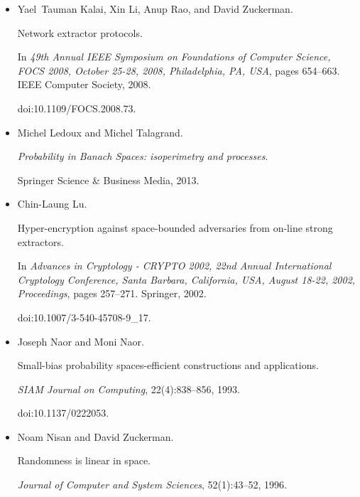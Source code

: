 \documentclass[10pt,a4paper]{article}
\begin{document}
\begin{itemize}
\item[] 
[24]

Yael Tauman Kalai, Xin Li, Anup Rao, and David Zuckerman.


Network extractor protocols.


In \emph{49th Annual IEEE Symposium on Foundations of Computer
Science, FOCS 2008, October 25-28, 2008, Philadelphia, PA, USA}, pages
654–663. IEEE Computer Society, 2008.


doi:10.1109/FOCS.2008.73.





\item[] 
[25]

Michel Ledoux and Michel Talagrand.


\emph{Probability in Banach Spaces: isoperimetry and processes}.


Springer Science \& Business Media, 2013.





\item[] 
[26]

Chin-Laung Lu.


Hyper-encryption against space-bounded adversaries from on-line
strong extractors.


In \emph{Advances in Cryptology - CRYPTO 2002, 22nd Annual
International Cryptology Conference, Santa Barbara, California, USA, August
18-22, 2002, Proceedings}, pages 257–271. Springer, 2002.


doi:10.1007/3-540-45708-9\_17.





\item[] 
[27]

Joseph Naor and Moni Naor.


Small-bias probability spaces-efficient constructions and
applications.


\emph{SIAM Journal on Computing}, 22(4):838–856, 1993.


doi:10.1137/0222053.





\item[] 
[28]

Noam Nisan and David Zuckerman.


Randomness is linear in space.


\emph{Journal of Computer and System Sciences}, 52(1):43–52, 1996.



\end{itemize}
\end{document}
